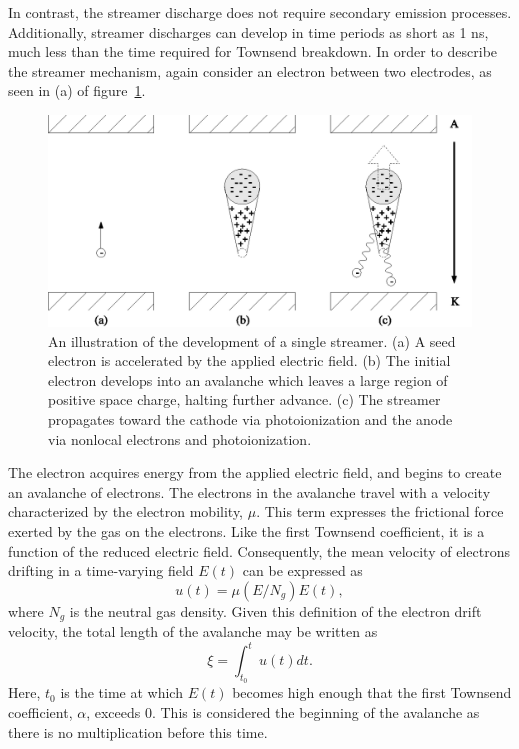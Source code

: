 {In contrast, the streamer discharge does not require secondary emission
processes. Additionally, streamer discharges can develop in time periods as
short as 1 ns, much less than the time required for Townsend breakdown. In order
to describe the streamer mechanism, again consider an electron between two
electrodes, as seen in (a) of figure~\ref{fig:streamer}.
\begin{figure}
  \centering
  \includegraphics{./chapters/theory/figures/streamer.eps}
  \caption{An illustration of the development of a single streamer. (a)
    A seed electron is accelerated by the applied electric field. (b) The
    initial electron develops into an avalanche which leaves a large region
    of positive space charge, halting further advance. (c) The streamer
    propagates toward the cathode via photoionization and the anode via
    nonlocal electrons and photoionization.}
  \label{fig:streamer}
\end{figure}
The electron acquires energy from the applied electric field, and begins to
create an avalanche of electrons. The electrons in the avalanche travel with a
velocity characterized by the electron mobility, $\mu$. This term expresses the
frictional force exerted by the gas on the electrons. Like the first Townsend
coefficient, it is a function of the reduced electric field. Consequently, the
mean velocity of electrons drifting in a time-varying field $E(t)$ can be
expressed as
\begin{equation}
  u(t) = \mu(E/N_g) E(t),
\end{equation}
where $N_g$ is the neutral gas density. Given this definition of the electron
drift velocity, the total length of the avalanche may be written as
\begin{equation}
  \xi = \int_{t_0}^t u(t) dt.
  \label{eq:s_xi}
\end{equation}
Here, $t_0$ is the time at which $E(t)$ becomes high enough that the first
Townsend coefficient, $\alpha$, exceeds 0. This is considered the beginning of
the avalanche as there is no multiplication before this time.

}

